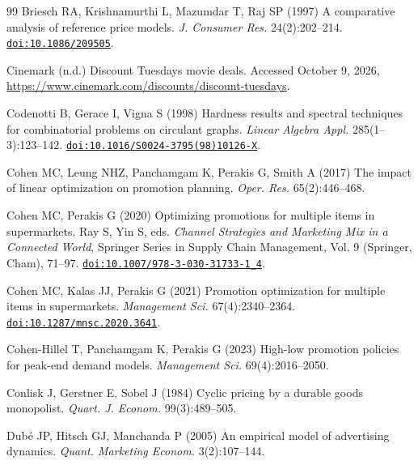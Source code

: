 \begin{thebibliography}{99}
Briesch RA, Krishnamurthi L, Mazumdar T, Raj SP (1997) A comparative analysis of reference price models. \emph{J. Consumer Res.} 24(2):202--214. \href{https://doi.org/10.1086/209505}{\nolinkurl{doi:10.1086/209505}}.

Cinemark (n.d.) Discount Tuesdays movie deals. Accessed October 9, 2026, \url{https://www.cinemark.com/discounts/discount-tuesdays}.

{\color{black}
Codenotti B, Gerace I, Vigna S (1998) Hardness results and spectral techniques for combinatorial problems on circulant graphs. \emph{Linear Algebra Appl.} 285(1--3):123--142. \href{https://doi.org/10.1016/S0024-3795(98)10126-X}{\nolinkurl{doi:10.1016/S0024-3795(98)10126-X}}.
\par}

Cohen MC, Leung NHZ, Panchamgam K, Perakis G, Smith A (2017) The impact of linear optimization on promotion planning. \emph{Oper. Res.} 65(2):446--468.

Cohen MC, Perakis G (2020) Optimizing promotions for multiple items in supermarkets. Ray S, Yin S, eds. \emph{Channel Strategies and Marketing Mix in a Connected World}, Springer Series in Supply Chain Management, Vol. 9 (Springer, Cham), 71--97. \href{https://doi.org/10.1007/978-3-030-31733-1_4}{\nolinkurl{doi:10.1007/978-3-030-31733-1_4}}.

Cohen MC, Kalas JJ, Perakis G (2021) Promotion optimization for multiple items in supermarkets. \emph{Management Sci.} 67(4):2340--2364. \href{https://doi.org/10.1287/mnsc.2020.3641}{\nolinkurl{doi:10.1287/mnsc.2020.3641}}.

Cohen-Hillel T, Panchamgam K, Perakis G (2023) High-low promotion policies for peak-end demand models. \emph{Management Sci.} 69(4):2016--2050.

 {\color{black} Conlisk J, Gerstner E, Sobel J (1984) Cyclic pricing by a durable goods monopolist. \emph{Quart. J. Econom.} 99(3):489--505.}

 {\color{black} Dub\'e JP, Hitsch GJ, Manchanda P (2005) An empirical model of advertising dynamics. \emph{Quant. Marketing Econom.} 3(2):107--144.}


\end{thebibliography}
